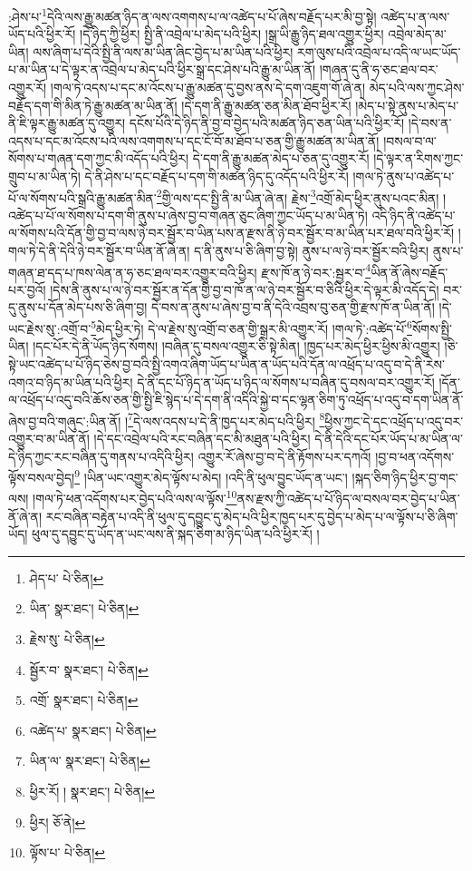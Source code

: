 :ཤེས་པ་\footnote{ཤེད་པ་  པེ་ཅིན། }དེའི་ལས་རྒྱུ་མཚན་ཉིད་ན་ལས་འགགས་པ་ལ་འཚེད་པ་པོ་ཞེས་བརྗོད་པར་མི་བྱ་སྟེ། འཚེད་པ་ན་ལས་ཡོད་པའི་ཕྱིར་རོ། །དེ་ཉིད་ཀྱི་ཕྱིར། སྤྱི་ནི་འབྲེལ་པ་མེད་པའི་ཕྱིར། །སྒྲ་ཡི་རྒྱུ་ཉིད་ཐལ་འགྱུར་ཕྱིར། འབྲེལ་མེད་མ་ཡིན། ལས་ཞིག་པ་དེའི་སྤྱི་ནི་ལས་མ་ཡིན་ཞིང་བྱེད་པ་མ་ཡིན་པའི་ཕྱིར། རག་ལུས་པའི་འབྲེལ་པ་འདི་ལ་ཡང་ཡོད་པ་མ་ཡིན་པ་དེ་ལྟར་ན་འབྲེལ་པ་མེད་པའི་ཕྱིར་སྒྲ་དང་ཤེས་པའི་རྒྱུ་མ་ཡིན་ནོ། །གཞན་དུ་ནི་ཧ་ཅང་ཐལ་བར་འགྱུར་རོ། །གལ་ཏེ་འདས་པ་དང་མ་འོངས་པ་རྒྱུ་མཚན་དུ་བྱས་ནས་དེ་དག་འཇུག་གོ་ཞེ་ན། མེད་པའི་ལས་ཀྱང་ཤེས་བརྗོད་དག་གི་མིན་ཏེ་རྒྱུ་མཚན་མ་ཡིན་ནོ། །དེ་དག་ནི་རྒྱུ་མཚན་ཅན་མིན་ཐོབ་ཕྱིར་རོ། །མེད་པ་སྟེ་ནུས་པ་མེད་པ་ནི་ཇི་ལྟར་རྒྱུ་མཚན་དུ་འགྱུར། དངོས་པོའི་དེ་ཉིད་ནི་བྱ་བ་བྱེད་པའི་མཚན་ཉིད་ཅན་ཡིན་པའི་ཕྱིར་རོ། །དེ་བས་ན་འདས་པ་དང་མ་འོངས་པའི་ལས་འགགས་པ་དང་ངོ་བོ་མ་ཐོབ་པ་ཅན་གྱི་རྒྱུ་མཚན་མ་ཡིན་ནོ། །བསལ་བ་ལ་སོགས་པ་གཞན་དག་ཀྱང་མི་འདོད་པའི་ཕྱིར། དེ་དག་ནི་རྒྱུ་མཚན་མེད་པ་ཅན་དུ་འགྱུར་རོ། །དེ་ལྟར་ན་རིགས་ཀྱང་གྲུབ་པ་མ་ཡིན་ཏེ། དེ་ནི་ཤེས་པ་དང་བརྗོད་པ་དག་གི་མཚན་ཉིད་དུ་འདོད་པའི་ཕྱིར་རོ། །གལ་ཏེ་ནུས་པ་འཚེད་པ་པོ་ལ་སོགས་པའི་སྒྲའི་རྒྱུ་མཚན་མིན་\footnote{ཡིན་  སྣར་ཐང་།  པེ་ཅིན། }གྱི་ལས་དང་སྤྱི་ནི་མ་ཡིན་ཞེ་ན། རྗེས་\footnote{རྗེས་སུ་  པེ་ཅིན། }འགྲོ་མེད་ཕྱིར་ནུས་པའང་མིན། །འཚེད་པ་པོ་ལ་སོགས་པ་དག་གི་ནུས་པ་ཞེས་བྱ་བ་གཞན་ཅུང་ཞིག་ཀྱང་ཡོད་པ་མ་ཡིན་ཏེ། འདི་ཉིད་ནི་འཚེད་པ་ལ་སོགས་པའི་དོན་གྱི་བྱ་བ་ལས་ཉེ་བར་སྦྱོར་བ་ཡིན་པས་ན་རྫས་ནི་ཉེ་བར་སྦྱོར་བ་མ་ཡིན་པར་ཐལ་བའི་ཕྱིར་རོ། །གལ་ཏེ་དེ་ནི་དེའི་ཉེ་བར་སྦྱོར་བ་ཡིན་ནོ་ཞེ་ན། ད་ནི་ནུས་པ་ཅི་ཞིག་བྱ་སྟེ། ནུས་པ་ལ་ཉེ་བར་སྦྱོར་བའི་ཕྱིར། ནུས་པ་གཞན་ཐ་དད་པ་ཁས་ལེན་ན་ཧ་ཅང་ཐལ་བར་འགྱུར་བའི་ཕྱིར། རྫས་ཁོ་ན་ཉེ་བར་:སྦྱར་བ་\footnote{སྦྱོར་བ་  སྣར་ཐང་།  པེ་ཅིན། }ཡིན་ནོ་ཞེས་བརྗོད་པར་བྱའོ། །དེས་ནི་ནུས་པ་ལ་ཉེ་བར་སྦྱོར་ན་དོན་གྱི་བྱ་བ་ཁོ་ན་ལ་ཉེ་བར་སྦྱོར་བ་ཅིའི་ཕྱིར་དེ་ལྟར་མི་འདོད་དེ། བར་དུ་ནུས་པ་དོན་མེད་པས་ཅི་ཞིག་བྱ། དེ་བས་ན་ནུས་པ་ཞེས་བྱ་བ་ནི་དེའི་འབྲས་བུ་ཅན་གྱི་རྫས་ཁོ་ན་ཡིན་ནོ། །དེ་ཡང་རྗེས་སུ་:འགྲོ་བ་\footnote{འགྲོ་  སྣར་ཐང་།  པེ་ཅིན། }མེད་ཕྱིར་ཏེ། དེ་ལ་རྗེས་སུ་འགྲོ་བ་ཅན་གྱི་སྒྲར་མི་འགྱུར་རོ། །གལ་ཏེ་:འཚེད་པོ་\footnote{འཚེད་པ་  སྣར་ཐང་།  པེ་ཅིན། }སོགས་སྤྱི་ཡིན། །དང་པོར་དེ་ནི་ཡོད་ཉིད་སོགས། །བཞིན་དུ་བསལ་འགྱུར་ཅི་སྟེ་མིན། །ཁྱད་པར་མེད་ཕྱིར་ཕྱིས་མི་འགྱུར། །ཅི་སྟེ་ཡང་འཚེད་པ་པོ་ཉིད་ཅེས་བྱ་བའི་སྤྱི་འགའ་ཞིག་ཡོད་པ་ཡིན་ན་ཡོད་པའི་དོན་ལ་འཕྲོད་པ་འདུ་བ་དེ་ནི་རེས་འགའ་བ་ཉིད་མ་ཡིན་པའི་ཕྱིར། དེ་ནི་དང་པོ་ཉིད་ན་ཡོད་པ་ཉིད་ལ་སོགས་པ་བཞིན་དུ་བསལ་བར་འགྱུར་རོ། །དོན་ལ་འཕྲོད་པ་འདུ་བའི་ཆོས་ཅན་གྱི་སྤྱི་ཇི་སྙེད་པ་དེ་དག་ནི་འདིའི་སྐྱེ་བ་དང་ལྷན་ཅིག་ཏུ་འཕྲོད་པ་འདུ་བ་དག་ཡིན་ནོ་ཞེས་བྱ་བའི་གཞུང་:ཡིན་ནོ། །\footnote{ཡིན་ལ་  སྣར་ཐང་།  པེ་ཅིན། }དེ་ལས་འདས་པ་དེ་ནི་ཁྱད་པར་མེད་པའི་ཕྱིར། \footnote{ཕྱིར་རོ། །   སྣར་ཐང་།  པེ་ཅིན། }ཕྱིས་ཀྱང་དེ་དང་འཕྲོད་པ་འདུ་བར་འགྱུར་བ་མ་ཡིན་ནོ། །དེ་དང་འབྲེལ་པའི་རང་བཞིན་དང་མི་མཐུན་པའི་ཕྱིར། དེ་ནི་དེའི་དང་པོར་ཡོད་པ་མ་ཡིན་ལ་དེ་ཉིད་ཀྱང་རང་བཞིན་དུ་གནས་པ་འདིའི་ཕྱིར། འགྱུར་རོ་ཞེས་བྱ་བ་དེ་ནི་རྟོགས་པར་དཀའོ། །བྱ་བ་ཕན་འདོགས་ལྟོས་བསལ་བྱེད།\footnote{ཕྱིར།  ཅོ་ནེ། } །ཡིན་ཡང་འགྱུར་མེད་ལྟོས་པ་མེད། །འདི་ནི་ཕུལ་བྱུང་ཡོད་ན་ཡང་། །སྐད་ཅིག་ཉིད་ཕྱིར་བྱ་གང་ལས། །གལ་ཏེ་ཕན་འདོགས་པར་བྱེད་པའི་ལས་ལ་ལྟོས་\footnote{ལྟོས་པ་  པེ་ཅིན། }ནས་རྫས་ཀྱི་འཚེད་པ་པོ་ཉིད་ལ་བསལ་བར་བྱེད་པ་ཡིན་ནོ་ཞེ་ན། རང་བཞིན་བརྟེན་པ་འདི་ནི་ཕུལ་དུ་དབྱུང་དུ་མེད་པའི་ཕྱིར་ཁྱད་པར་དུ་བྱེད་པ་མེད་པ་ལ་ལྟོས་པ་ཅི་ཞིག་ཡོད། ཕུལ་དུ་དབྱུང་དུ་ཡོད་ན་ཡང་ལས་ནི་སྐད་ཅིག་མ་ཉིད་ཡིན་པའི་ཕྱིར་རོ། །
